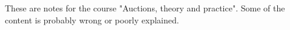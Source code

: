 These are notes for the course "Auctions, theory and practice". Some of the content is probably wrong or poorly explained.